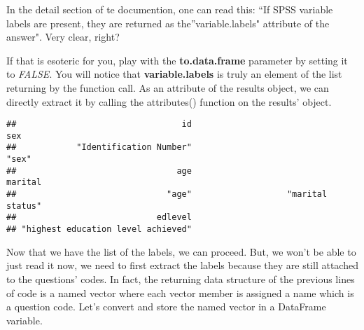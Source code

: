\documentclass[]{article}
\newenvironment{Shaded}{\begin{snugshade}}{\end{snugshade}}
\newcommand{\CommentTok}[1]{\textcolor[rgb]{0.56,0.35,0.01}{\textit{#1}}}
\newcommand{\DataTypeTok}[1]{\textcolor[rgb]{0.13,0.29,0.53}{#1}}
\newcommand{\DecValTok}[1]{\textcolor[rgb]{0.00,0.00,0.81}{#1}}
\newcommand{\KeywordTok}[1]{\textcolor[rgb]{0.13,0.29,0.53}{\textbf{#1}}}
\newcommand{\NormalTok}[1]{#1}
\newcommand{\OperatorTok}[1]{\textcolor[rgb]{0.81,0.36,0.00}{\textbf{#1}}}
\newcommand{\OtherTok}[1]{\textcolor[rgb]{0.56,0.35,0.01}{#1}}
\newcommand{\StringTok}[1]{\textcolor[rgb]{0.31,0.60,0.02}{#1}}
\begin{document}
In the detail section of te documention, one can read this: ``If SPSS
variable labels are present, they are returned as the''variable.labels"
attribute of the answer". Very clear, right?

If that is esoteric for you, play with the \textbf{to.data.frame}
parameter by setting it to \emph{FALSE}. You will notice that
\textbf{variable.labels} is truly an element of the list returning by
the function call. As an attribute of the results object, we can
directly extract it by calling the attributes() function on the results'
object.

\begin{Shaded}
\end{Shaded}

\begin{verbatim}
##                                 id                                sex 
##            "Identification Number"                              "sex" 
##                                age                            marital 
##                              "age"                   "marital status" 
##                            edlevel 
## "highest education level achieved"
\end{verbatim}

Now that we have the list of the labels, we can proceed. But, we won't
be able to just read it now, we need to first extract the labels because
they are still attached to the questions' codes. In fact, the returning
data structure of the previous lines of code is a named vector where
each vector member is assigned a name which is a question code. Let's
convert and store the named vector in a DataFrame variable.
\end{document}
